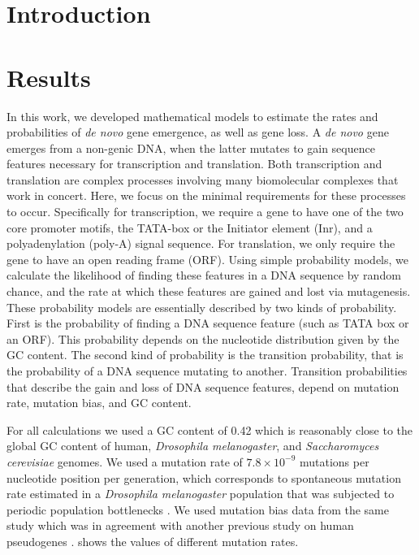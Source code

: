 \documentclass[12pt,a4paper]{article}
\begin{document}
\onehalfspacing

\section{Introduction}

\section{Results}

In this work, we developed mathematical models to estimate the rates and probabilities of \textit{de novo} gene emergence, as well as gene loss. A \textit{de novo} gene emerges from a non-genic DNA, when the latter mutates to gain sequence features necessary for transcription and translation. Both transcription and translation are complex processes involving many biomolecular complexes that work in concert. Here, we focus on the minimal requirements for these processes to occur. Specifically for transcription, we require a gene to have one of the two core promoter motifs, the TATA-box or the Initiator element (Inr), and a polyadenylation (poly-A) signal sequence. For translation, we only require the gene to have an open reading frame (ORF). Using simple probability models, we calculate the likelihood of finding these features in a DNA sequence by random chance, and the rate at which these features are gained and lost via mutagenesis. These probability models are essentially described by two kinds of probability. First is the probability of finding a DNA sequence feature (such as TATA box or an ORF). This probability depends on the nucleotide distribution given by the GC content. The second kind of probability is the transition probability, that is the probability of a DNA sequence mutating to another. Transition probabilities that describe the gain and loss of DNA sequence features, depend on mutation rate, mutation bias, and GC content. 

For all calculations we used a GC content of 0.42 which is reasonably close to the global GC content of human, \textit{Drosophila melanogaster}, and \textit{Saccharomyces cerevisiae} genomes. We used a mutation rate of $7.8\times10^{-9}$ mutations per nucleotide position per generation, which corresponds to spontaneous mutation rate estimated in a \textit{Drosophila melanogaster} population that was subjected to periodic population bottlenecks \cite[mutation accumulation line,][]{drosophilamutrate}. We used mutation bias data from the same study \citep{drosophilamutrate} which was in agreement with another previous study on human pseudogenes \citep{humanmutrate}. shows the values of different mutation rates. 
\end{document}

